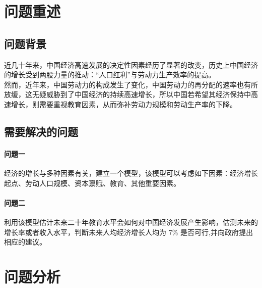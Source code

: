 \documentclass[UTF8]{article}
\begin{document}
	\section{问题重述}
		\subsection{问题背景}
		\indent 近几十年来，中国经济高速发展的决定性因素经历了显著的改变，历史上中国经济的增长受到两股力量的推动：“人口红利”与劳动力生产效率的提高。
		\\\indent 然而，近年来，中国劳动力的构成发生了变化，中国劳动力的再分配的速率也有所放缓，这无疑威胁到了中国经济的持续高速增长，所以中国若希望其经济保持中高速增长，则需要重视教育因素，从而弥补劳动力规模和劳动生产率的下降。
		\subsection{需要解决的问题}
		\paragraph{问题一}经济的增长与多种因素有关，建立一个模型，该模型可以考虑如下因素：{\heiti 经济增长起点}、{\heiti 劳动人口规模}、{\heiti 资本禀赋}、{\heiti 教育}、{\heiti 其他重要因素}。
		\paragraph{问题二}利用该模型估计未来二十年{\heiti 教育水平}会如何对中国经济发展产生影响，估测未来的{\heiti 增长率}或者{\heiti 收入水平}，判断未来人均经济增长人均为 7\% 是否可行,并向政府提出相应的建议。
	\section{问题分析}	
\end{document}
